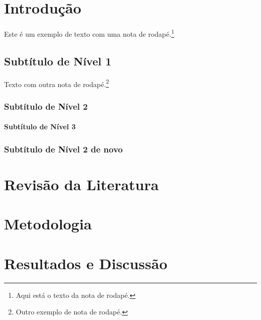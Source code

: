 \documentclass[12pt,a4paper,oneside,brazil]{abntex2}
\begin{document}
\setcounter{page}{1}
\textual

\justifying
\normalfont

\chapter{Introdução}
Este é um exemplo de texto com uma nota de rodapé.\footnote{Aqui está o texto da nota de rodapé.} \lipsum[1]

\section{Subtítulo de Nível 1}
Texto com outra nota de rodapé.\footnote{Outro exemplo de nota de rodapé.} \lipsum[2-3]

\subsection{Subtítulo de Nível 2}
\lipsum[4]
\subsubsection{Subtítulo de Nível 3}
\lipsum[5]
\lipsum[5]

\subsection{Subtítulo de Nível 2 de novo}

\chapter{Revisão da Literatura}
\lipsum[6-7]

\chapter{Metodologia}
\lipsum[8-9]

\chapter{Resultados e Discussão}
\lipsum[10]
\end{document}
